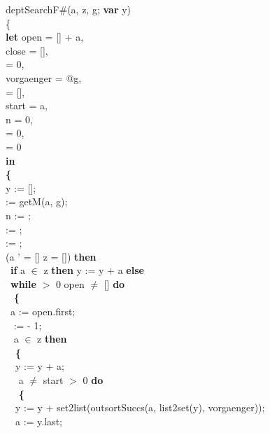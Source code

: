 deptSearchF\#(a, z, g; {\bf var} y) \\
\{\\
{\bf let} open = [] + a,\\
 close = [],\\
  = 0,\\
 vorgaenger = @g,\\
  = [],\\
 start = a,\\
 n = 0,\\
  = 0,\\
  = 0\\
 {\bf in}\\
 {\bf \{}\\
\tabbe y := [];\\
\tabbe {} := getM(a, g);\\
\tabbe n := ;\\
\tabbe {} := ;\\
\tabbe {} := ;\\
 \Not (a ' = [] \Or z = []) {\bf then}\\
\tabbe \tabif\  {\bf if} a $\in$ z {\bf then} y := y + a {\bf else}\\
\tabbe \tabif\  {\bf while}  $>$ 0 \And open $\neq$ [] {\bf do}\\
\tabbe \tabif\  {\bf \{}\\
\tabbe \tabif\ \tabbe a := open.first;\\
\tabbe \tabif\ \tabbe {} :=  - 1;\\
\tabbe \tabif\  a $\in$ z {\bf then}\\
\tabbe \tabif\ \tabbe \tabif\  {\bf \{}\\
\tabbe \tabif\ \tabbe \tabif\ \tabbe y := y + a;\\
\tabbe \tabif\ \tabbe \tabif\  a $\neq$ start \And {} $>$ 0 {\bf do}\\
\tabbe \tabif\ \tabbe \tabif\ \tabbe {} {\bf \{}\\
\tabbe \tabif\ \tabbe \tabif\ \tabbe {}\tabbe y := y + set2list(outsortSuccs(a, list2set(y), vorgaenger));\\
\tabbe \tabif\ \tabbe \tabif\ \tabbe {}\tabbe a := y.last;\\
